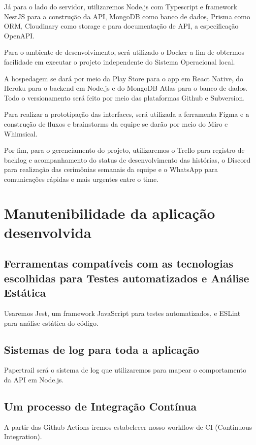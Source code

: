 Já para o lado do servidor, utilizaremos Node.js com Typescript e framework NestJS para a construção da API, MongoDB como banco de dados, Prisma como ORM, Cloudinary como storage e para documentação de API, a especificação OpenAPI.

Para o ambiente de desenvolvimento, será utilizado o Docker a fim de obtermos facilidade em executar o projeto independente do Sistema Operacional local.

A hospedagem se dará por meio da Play Store para o app em React Native, do Heroku para o backend em Node.js e do MongoDB Atlas para o banco de dados.
Todo o versionamento será feito por meio das plataformas Github e Subversion.

Para realizar a prototipação das interfaces, será utilizada a ferramenta Figma e a construção de fluxos e brainstorms da equipe se darão por meio do Miro e Whimsical.

Por fim, para o gerenciamento do projeto, utilizaremos o Trello para registro de backlog e acompanhamento do status de desenvolvimento das histórias, o Discord para realização das cerimônias semanais da equipe e o WhatsApp para comunicações rápidas e mais urgentes entre o time.

\chapter{Manutenibilidade da aplicação desenvolvida}

\section{Ferramentas compatíveis com as tecnologias escolhidas para Testes automatizados e Análise Estática}
Usaremos Jest, um framework JavaScript para testes automatizados, e ESLint para análise estática do código.

\section{Sistemas de log para toda a aplicação}
Papertrail será o sistema de log que utilizaremos para mapear o comportamento da API em Node.js.

\section{Um processo de Integração Contínua}
A partir das Github Actions iremos estabelecer nosso workflow de CI (Continuous Integration).

